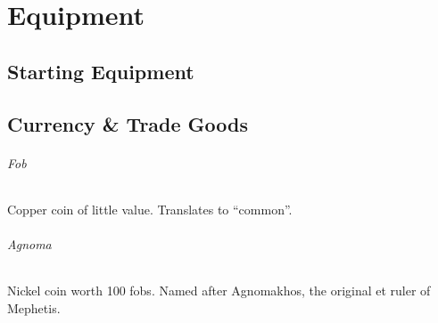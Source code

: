 \chapter{Equipment} \label{ch::equipment}
\section{Starting Equipment} \label{sec::startingequipment}

\section{Currency \& Trade Goods} \label{sec::currency}
\subparagraph{Fob}
    Copper coin of little value.
    Translates to ``common''.
\subparagraph{Agnoma}
    Nickel coin worth 100 fobs.
    Named after Agnomakhos, the original et ruler of Mephetis.








